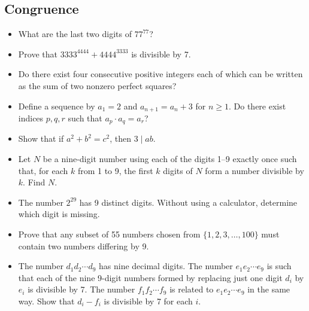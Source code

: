 \documentclass[12pt]{article}
\begin{document}
\subsection{Congruence}
\begin{itemize}
  \item What are the last two digits of $77^{77}$?

  \item Prove that $3333^{4444} + 4444^{3333}$ is divisible by 7.

  \item Do there exist four consecutive positive integers each of which can be written as the sum of two nonzero perfect squares?

  \item Define a sequence by $a_1 = 2$ and $a_{n+1} = a_n + 3$ for $n \ge 1$. Do there exist indices $p, q, r$ such that $a_p \cdot a_q = a_r$?

  \item Show that if $a^2 + b^2 = c^2$, then $3 \mid ab$.

  \item Let $N$ be a nine-digit number using each of the digits 1--9 exactly once such that, for each $k$ from 1 to 9, the first $k$ digits of $N$ form a number divisible by $k$. Find $N$.

  \item The number $2^{29}$ has 9 distinct digits. Without using a calculator, determine which digit is missing.

  \item Prove that any subset of 55 numbers chosen from $\{1, 2, 3, \ldots, 100\}$ must contain two numbers differing by 9.

  \item  The number $d_1d_2\cdots d_9$ has nine decimal digits. The number $e_1e_2\cdots e_9$ is such that each of the nine 9-digit numbers formed by replacing just one digit $d_i$ by $e_i$ is divisible by 7. The number $f_1f_2\cdots f_9$ is related to $e_1e_2\cdots e_9$ in the same way. Show that $d_i - f_i$ is divisible by 7 for each $i$.
\end{itemize}
\end{document}
